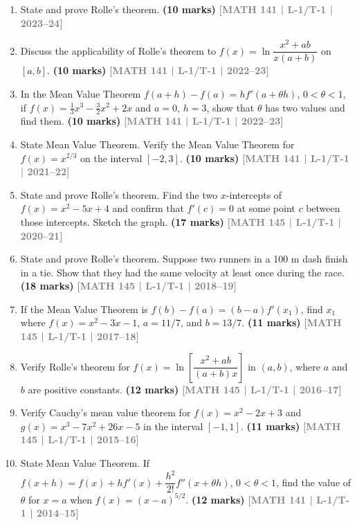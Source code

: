 \documentclass[12pt,a4paper]{article}
\newcommand{\yr}[1]{\hfill\textcolor{gray}{\small\textbf{[#1]}}}
\newcommand{\mk}[1]{\textcolor{orange!70!black}{\small\textbf{(#1 marks)}}}
\begin{document}
\begin{enumerate}\item State and prove Rolle's theorem.
\mk{10} \yr{MATH 141 | L-1/T-1 | 2023--24}

\item Discuss the applicability of Rolle's theorem to $f(x)=\ln\!\dfrac{x^{2}+ab}{x(a+b)}$ on $[a,b]$.
\mk{10} \yr{MATH 141 | L-1/T-1 | 2022--23}

\item In the Mean Value Theorem $f(a+h)-f(a)=hf'(a+\theta h)$, $0<\theta<1$, if $f(x)=\tfrac{1}{3}x^{3}-\tfrac{3}{2}x^{2}+2x$ and $a=0$, $h=3$, show that $\theta$ has two values and find them.
\mk{10} \yr{MATH 141 | L-1/T-1 | 2022--23}



\item State Mean Value Theorem. Verify the Mean Value Theorem for $f(x)=x^{2/3}$ on the interval $[-2,3]$.
\mk{10} \yr{MATH 141 | L-1/T-1 | 2021--22}

\item State and prove Rolle's theorem. Find the two $x$-intercepts of $f(x)=x^{2}-5x+4$ and confirm that $f'(c)=0$ at some point $c$ between those intercepts. Sketch the graph.
\mk{17} \yr{MATH 145 | L-1/T-1 | 2020--21}

\item State and prove Rolle's theorem. Suppose two runners in a 100 m dash finish in a tie. Show that they had the same velocity at least once during the race.
\mk{18} \yr{MATH 145 | L-1/T-1 | 2018--19}

\item If the Mean Value Theorem is $f(b)-f(a)=(b-a)f'(x_{1})$, find $x_{1}$ where $f(x)=x^{2}-3x-1$, $a=11/7$, and $b=13/7$.
\mk{11} \yr{MATH 145 | L-1/T-1 | 2017--18}

\item Verify Rolle's theorem for $f(x)=\ln\!\left[\dfrac{x^{2}+ab}{(a+b)x}\right]$ in $(a,b)$, where $a$ and $b$ are positive constants.
\mk{12} \yr{MATH 145 | L-1/T-1 | 2016--17}

\item Verify Cauchy's mean value theorem for $f(x)=x^{2}-2x+3$ and $g(x)=x^{3}-7x^{2}+26x-5$ in the interval $[-1,1]$.
\mk{11} \yr{MATH 145 | L-1/T-1 | 2015--16}

\item State Mean Value Theorem. If $f(x+h)=f(x)+hf'(x)+\dfrac{h^{2}}{2!}f''(x+\theta h)$, $0<\theta<1$, find the value of $\theta$ for $x=a$ when $f(x)=(x-a)^{5/2}$.
\mk{12} \yr{MATH 141 | L-1/T-1 | 2014--15}


\end{enumerate}
\end{document}
